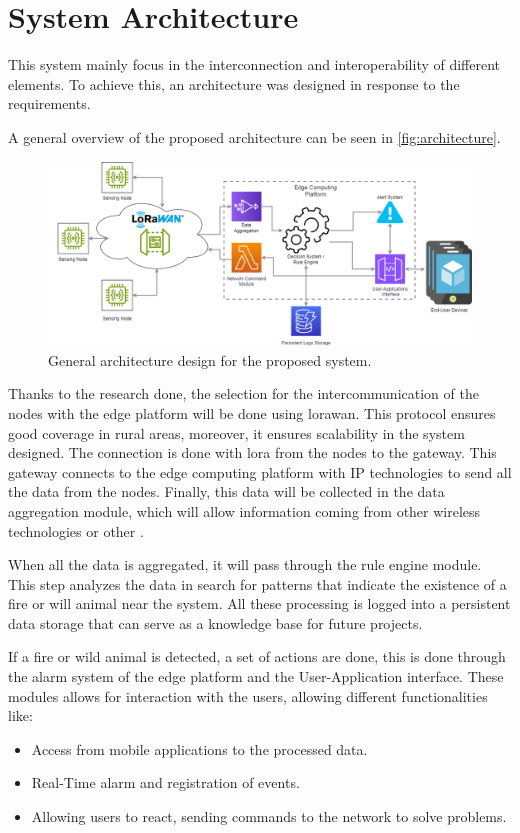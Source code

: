 \section{System Architecture}

This system mainly focus in the interconnection and interoperability of different elements. 
To achieve this, an architecture was designed in response to the requirements.

A general overview of the proposed architecture can be seen in \autoref{fig:architecture}.

\begin{figure}[H]
    \centering
    \includegraphics[width=1\textwidth]{./images/7/generalArchitecture.png}
    \caption{General architecture design for the proposed system.}
    \label{fig:architecture}
\end{figure}

Thanks to the research done, the selection for the intercommunication of the nodes with the edge platform 
will be done using \acrshort{lorawan}. This protocol ensures good coverage in rural areas, moreover, it ensures 
scalability in the system designed. The connection is done with lora from the nodes to the gateway. 
This gateway connects to the edge computing platform with IP technologies to send all the data from the nodes. 
Finally, this data will be collected in the data aggregation module, which will allow information coming from other 
wireless technologies or other .

When all the data is aggregated, it will pass through the rule engine module. This step analyzes the data in search 
for patterns that indicate the existence of a fire or will animal near the system. All these processing is logged into a 
persistent data storage that can serve as a knowledge base for future projects. 

If a fire or wild animal is detected, a set of actions are done, this is done through the alarm system of the edge platform and 
the User-Application interface. These modules allows for interaction with the users, allowing different functionalities like:
\begin{itemize}
    \item Access from mobile applications to the processed data.
    \item Real-Time alarm and registration of events.
    \item Allowing users to react, sending commands to the network to solve problems.
\end{itemize}

